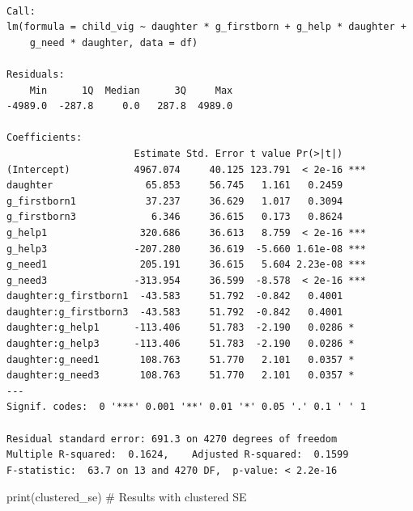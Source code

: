 \documentclass[
  letterpaper,
  DIV=11,
  numbers=noendperiod]{scrartcl}
\newenvironment{Shaded}{\begin{snugshade}}{\end{snugshade}}
\newcommand{\CommentTok}[1]{\textcolor[rgb]{0.37,0.37,0.37}{#1}}
\newcommand{\FunctionTok}[1]{\textcolor[rgb]{0.28,0.35,0.67}{#1}}
\newcommand{\NormalTok}[1]{\textcolor[rgb]{0.00,0.23,0.31}{#1}}
\begin{document}
\begin{verbatim}

Call:
lm(formula = child_vig ~ daughter * g_firstborn + g_help * daughter + 
    g_need * daughter, data = df)

Residuals:
    Min      1Q  Median      3Q     Max 
-4989.0  -287.8     0.0   287.8  4989.0 

Coefficients:
                      Estimate Std. Error t value Pr(>|t|)    
(Intercept)           4967.074     40.125 123.791  < 2e-16 ***
daughter                65.853     56.745   1.161   0.2459    
g_firstborn1            37.237     36.629   1.017   0.3094    
g_firstborn3             6.346     36.615   0.173   0.8624    
g_help1                320.686     36.613   8.759  < 2e-16 ***
g_help3               -207.280     36.619  -5.660 1.61e-08 ***
g_need1                205.191     36.615   5.604 2.23e-08 ***
g_need3               -313.954     36.599  -8.578  < 2e-16 ***
daughter:g_firstborn1  -43.583     51.792  -0.842   0.4001    
daughter:g_firstborn3  -43.583     51.792  -0.842   0.4001    
daughter:g_help1      -113.406     51.783  -2.190   0.0286 *  
daughter:g_help3      -113.406     51.783  -2.190   0.0286 *  
daughter:g_need1       108.763     51.770   2.101   0.0357 *  
daughter:g_need3       108.763     51.770   2.101   0.0357 *  
---
Signif. codes:  0 '***' 0.001 '**' 0.01 '*' 0.05 '.' 0.1 ' ' 1

Residual standard error: 691.3 on 4270 degrees of freedom
Multiple R-squared:  0.1624,    Adjusted R-squared:  0.1599 
F-statistic:  63.7 on 13 and 4270 DF,  p-value: < 2.2e-16
\end{verbatim}

\begin{Shaded}
\begin{Highlighting}[]
\FunctionTok{print}\NormalTok{(clustered\_se)    }\CommentTok{\# Results with clustered SE}
\end{Highlighting}
\end{Shaded}
\end{document}
